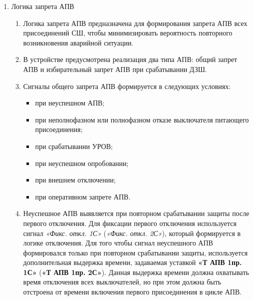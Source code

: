 \color{black}

\begin{enumerate}[label=\arabic{section}.\arabic{subsection}.\arabic{enumi}, labelsep=4pt, leftmargin=0pt, itemindent=57pt, itemsep=0pt, parsep=5pt] %


\item Логика запрета АПВ

\begin{enumerate}[label=\arabic{section}.\arabic{subsection}.\arabic{enumi}.\arabic*, labelsep=4pt, leftmargin=0em, itemindent=65pt, parsep=0pt]

\item
Логика запрета АПВ предназначена для формирования запрета АПВ всех присоединений СШ, чтобы минимизировать вероятность повторного возникновения аварийной ситуации. 

\item
В устройстве предусмотрена реализация два типа АПВ: общий запрет АПВ и избирательный запрет АПВ при срабатывании ДЗШ.

\item
Сигналы общего запрета АПВ формируется в следующих условиях:
\begin{itemize}
\item при неуспешном АПВ;
\item при неполнофазном или полнофазном отказе выключателя питающего присоединения;
\item при срабатывании УРОВ;
\item при неуспешном опробовании;
\item при внешнем отключении;
\item при оперативном запрете АПВ.
\end{itemize}

\item
Неуспешное АПВ выявляется при повторном срабатывании защиты после первого отключения.
Для фиксации первого отключения используется сигнал \textit{«Фикс. откл. 1С»} (\textit{«Фикс. откл. 2С»}), который формируется в логике отключения.
Для того чтобы сигнал неуспешного АПВ формировался только при повторном срабатывании защиты, используется дополнительная выдержка времени, задаваемая уставкой \textbf{«Т АПВ 1пр. 1С»} (\textbf{«Т АПВ 1пр. 2С»}).
Данная выдержка времени должна охватывать время отключения всех выключателей, но при этом должна быть отстроена от времени включения первого присоединения в цикле АПВ.


\end{enumerate}
\end{enumerate}
